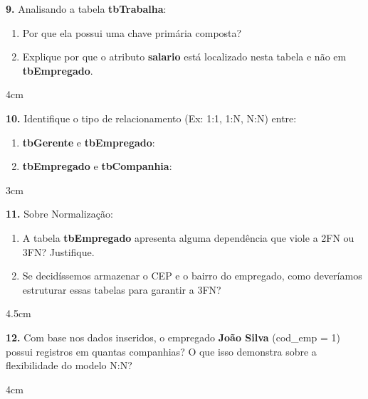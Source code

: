 \documentclass[12pt]{article}
\begin{document}
\vspace{0.4cm}

\textbf{9.} Analisando a tabela \textbf{tbTrabalha}:
\begin{enumerate}[label=\alph*)]
  \item Por que ela possui uma chave primária composta? 
  \item Explique por que o atributo \textbf{salario} está localizado nesta tabela e não em \textbf{tbEmpregado}.
\end{enumerate}
\begin{resposta}{4cm}
\end{resposta}

\vspace{0.5cm}

\textbf{10.} Identifique o tipo de relacionamento (Ex: 1:1, 1:N, N:N) entre:
\begin{enumerate}[label=\alph*)]
  \item \textbf{tbGerente} e \textbf{tbEmpregado}: 
  \item \textbf{tbEmpregado} e \textbf{tbCompanhia}:
\end{enumerate}
\begin{resposta}{3cm}
\end{resposta}

\vspace{0.5cm}

\textbf{11.} Sobre Normalização:
\begin{enumerate}[label=\alph*)]
  \item A tabela \textbf{tbEmpregado} apresenta alguma dependência que viole a 2FN ou 3FN? Justifique.
  \item Se decidíssemos armazenar o CEP e o bairro do empregado, como deveríamos estruturar essas tabelas para garantir a 3FN?
\end{enumerate}
\begin{resposta}{4.5cm}
\end{resposta}



\textbf{12.} Com base nos dados inseridos, o empregado \textbf{João Silva} (cod\_emp = 1) possui registros em quantas companhias? O que isso demonstra sobre a flexibilidade do modelo N:N?
\begin{resposta}{4cm}
\end{resposta}
\end{document}
